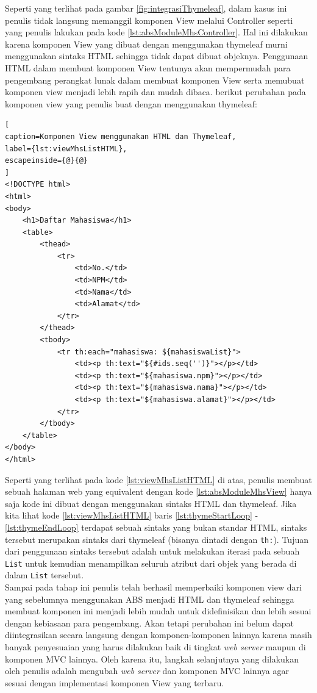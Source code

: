 Seperti yang terlihat pada gambar \ref{fig:integrasiThymeleaf}, dalam kasus ini penulis tidak langsung memanggil komponen View melalui Controller seperti yang penulis lakukan pada kode \ref{lst:absModuleMhsController}. Hal ini dilakukan karena komponen View yang dibuat dengan menggunakan thymeleaf murni menggunakan sintaks HTML sehingga tidak dapat dibuat objeknya. Penggunaan HTML dalam membuat komponen View tentunya akan mempermudah para pengembang perangkat lunak dalam membuat komponen View serta memubuat komponen view menjadi lebih rapih dan mudah dibaca. berikut perubahan pada komponen view yang penulis buat dengan menggunakan thymeleaf:

\begin{lstlisting}[
caption=Komponen View menggunakan HTML dan Thymeleaf,
label={lst:viewMhsListHTML},
escapeinside={@}{@}
]
<!DOCTYPE html>
<html>
<body>
	<h1>Daftar Mahasiswa</h1>
	<table>
		<thead>
			<tr>
				<td>No.</td>
				<td>NPM</td>
				<td>Nama</td>
				<td>Alamat</td>
			</tr>
		</thead>
		<tbody>
			<tr th:each="mahasiswa: ${mahasiswaList}">
				<td><p th:text="${#ids.seq('')}"></p></td>
				<td><p th:text="${mahasiswa.npm}"></p></td>
				<td><p th:text="${mahasiswa.nama}"></p></td>
				<td><p th:text="${mahasiswa.alamat}"></p></td>
			</tr>
		</tbody>
	</table>
</body>
</html>
\end{lstlisting}

Seperti yang terlihat pada kode \ref{lst:viewMhsListHTML} di atas, penulis membuat sebuah halaman web yang equivalent dengan kode \ref{lst:absModuleMhsView} hanya saja kode ini dibuat dengan menggunakan sintaks HTML dan thymeleaf. Jika kita lihat kode \ref{lst:viewMhsListHTML} baris \ref{lst:thymeStartLoop} - \ref{lst:thymeEndLoop} terdapat sebuah sintaks yang bukan standar HTML, sintaks tersebut merupakan sintaks dari thymeleaf (bisanya dintadi dengan \texttt{th:}). Tujuan dari penggunaan sintaks tersebut adalah untuk melakukan iterasi pada sebuah \texttt{List} untuk kemudian menampilkan seluruh atribut dari objek yang berada di dalam \texttt{List} tersebut.\\

Sampai pada tahap ini penulis telah berhasil memperbaiki komponen view dari yang sebelumnya menggunakan ABS menjadi HTML dan thymeleaf sehingga membuat komponen ini menjadi lebih mudah untuk didefinisikan dan lebih sesuai dengan kebiasaan para pengembang. Akan tetapi perubahan ini belum dapat diintegrasikan secara langsung dengan komponen-komponen lainnya karena masih banyak penyesuaian yang harus dilakukan baik di tingkat \textit{web server} maupun di komponen MVC lainnya. Oleh karena itu, langkah selanjutnya yang dilakukan oleh penulis adalah mengubah \textit{web server} dan komponen MVC lainnya agar sesuai dengan implementasi komponen View yang terbaru.

